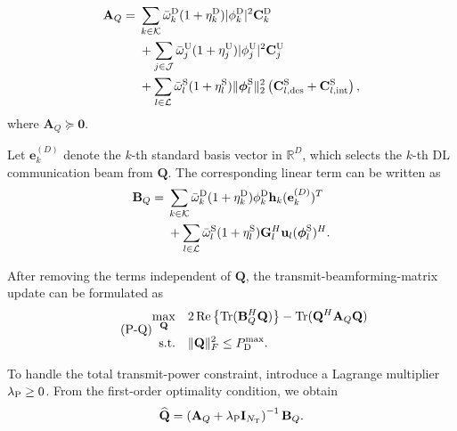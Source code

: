 \documentclass[letterpaper,journal]{IEEEtran}
\begin{document}
\begin{equation}
\begin{aligned}
\mathbf A_Q
={}&
\sum_{k\in\mathcal K}
\bar\omega_k^{\rm D}
(1+\eta_k^{\rm D})
|\phi_k^{\rm D}|^2
\mathbf C_k^{\rm D}\\
&+
\sum_{j\in\mathcal J}
\bar\omega_j^{\rm U}
(1+\eta_j^{\rm U})
|\phi_j^{\rm U}|^2
\mathbf C_j^{\rm U}\\
&+
\sum_{l\in\mathcal L}
\bar\omega_l^{\rm S}
(1+\eta_l^{\rm S})
\|\boldsymbol\phi_l^{\rm S}\|_2^2
\left(
\mathbf C_{l,{\rm des}}^{\rm S}
+
\mathbf C_{l,{\rm int}}^{\rm S}
\right),
\end{aligned}
\label{eq:A_Q}
\end{equation}
where $\mathbf A_Q\succeq\mathbf 0$.

Let $\mathbf e_k^{(D)}$ denote the $k$-th standard basis vector in $\mathbb R^D$, which selects the $k$-th DL communication beam from $\mathbf Q$. The corresponding linear term can be written as
\begin{equation}
\begin{aligned}
\mathbf B_Q
={}&
\sum_{k\in\mathcal K}
\bar\omega_k^{\rm D}
(1+\eta_k^{\rm D})
\phi_k^{\rm D}
\mathbf h_k
(\mathbf e_k^{(D)})^T\\
&+
\sum_{l\in\mathcal L}
\bar\omega_l^{\rm S}
(1+\eta_l^{\rm S})
\mathbf G_l^H\mathbf u_l
(\boldsymbol\phi_l^{\rm S})^H.
\end{aligned}
\label{eq:B_Q}
\end{equation}

After removing the terms independent of $\mathbf Q$, the transmit-beamforming-matrix update can be formulated as
\begin{equation}
\tag{P-Q}
\begin{aligned}
\max_{\mathbf Q}\quad&
2\operatorname{Re}
\left\{
\operatorname{Tr}(\mathbf B_Q^H\mathbf Q)
\right\}
-
\operatorname{Tr}
(\mathbf Q^H\mathbf A_Q\mathbf Q)
\\
\text{s.t.}\quad&
\|\mathbf Q\|_F^2
\le
P_{\rm D}^{\max}.
\end{aligned}
\label{prob:PQ}
\end{equation}

To handle the total transmit-power constraint, introduce a Lagrange multiplier $\lambda_{\rm P}\ge0$. From the first-order optimality condition, we obtain
\begin{equation}
\widehat{\mathbf Q}
=
\left(
\mathbf A_Q
+
\lambda_{\rm P}\mathbf I_{N_{\rm T}}
\right)^{-1}
\mathbf B_Q.
\label{eq:Q_update}
\end{equation}
\end{document}
